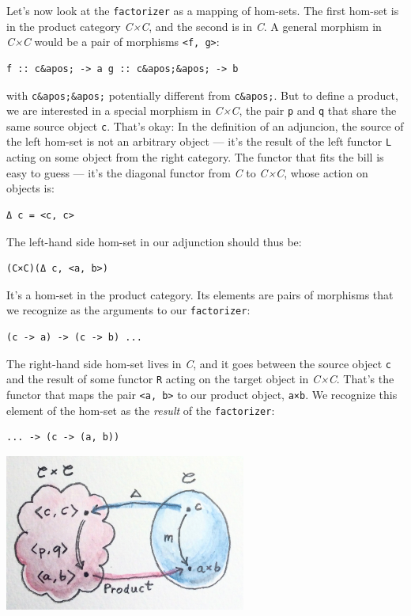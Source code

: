 Let's now look at the \texttt{factorizer} as a mapping of hom-sets. The
first hom-set is in the product category \emph{C×C}, and the second is
in \emph{C}. A general morphism in \emph{C×C} would be a pair of
morphisms \texttt{\textless{}f,\ g\textgreater{}}:

\begin{verbatim}
f :: c&apos; -> a g :: c&apos;&apos; -> b
\end{verbatim}

with \texttt{c\&apos;\&apos;} potentially different from
\texttt{c\&apos;}. But to define a product, we are interested in a
special morphism in \emph{C×C}, the pair \texttt{p} and \texttt{q} that
share the same source object \texttt{c}. That's okay: In the definition
of an adjuncion, the source of the left hom-set is not an arbitrary
object --- it's the result of the left functor \texttt{L} acting on some
object from the right category. The functor that fits the bill is easy
to guess --- it's the diagonal functor from \emph{C} to \emph{C×C},
whose action on objects is:

\begin{verbatim}
Δ c = <c, c>
\end{verbatim}

The left-hand side hom-set in our adjunction should thus be:

\begin{verbatim}
(C×C)(Δ c, <a, b>)
\end{verbatim}

It's a hom-set in the product category. Its elements are pairs of
morphisms that we recognize as the arguments to our \texttt{factorizer}:

\begin{verbatim}
(c -> a) -> (c -> b) ...
\end{verbatim}

The right-hand side hom-set lives in \emph{C}, and it goes between the
source object \texttt{c} and the result of some functor \texttt{R}
acting on the target object in \emph{C×C}. That's the functor that maps
the pair \texttt{\textless{}a,\ b\textgreater{}} to our product object,
\texttt{a×b}. We recognize this element of the hom-set as the
\emph{result} of the \texttt{factorizer}:

\begin{verbatim}
... -> (c -> (a, b))
\end{verbatim}

\includegraphics[width=3.12500in]{images/adj-product.jpg}

